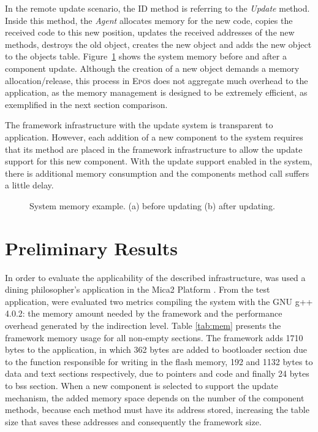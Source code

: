 \documentclass[10pt]{sigplanconf}
\newcommand{\epos}{\textsc{Epos}}
\newcommand{\agent}{\textit{Agent}}
\newcommand{\fig}[4][tb]{
  \begin{figure}[#1] {\centering{\texttt{[image: figures/\#2]}}\par}
    \caption{#3\label{fig:#2}}
  \end{figure}
}
\begin{document}
In the remote update scenario, the ID method is referring to the \textit{Update} method. Inside this method, the \agent{} allocates memory for the new code, copies the received code to this new position, updates the received addresses of the new methods, destroys the old object, creates the new object and adds the new object to the objects table. Figure~\ref{fig:memory_3_eng.pdf} shows the system memory before and after a component update. Although the creation of a new object demands a memory allocation/release, this process in \epos{} does not aggregate much overhead to the application, as the memory management is designed to be extremely efficient, as exemplified in the next section comparison.

The framework infrastructure with the update system is transparent to application. However, each addition of a new component to the system requires that its method are placed in the framework infrastructure to allow the update support for this new component. With the update support enabled in the system, there is additional memory consumption and the components method call suffers a little delay.

\fig{memory_3_eng.pdf}{System memory example. (a) before updating (b) after updating.}{width=6cm}

\section{Preliminary Results}

In order to evaluate the applicability of the described infrastructure, was used a dining philosopher's application in the Mica2 Platform \cite{mica2}. From the test application, were evaluated two metrics compiling the system with the GNU g++ 4.0.2: the memory amount needed by the framework and the performance overhead generated by the indirection level. Table \ref{tab:mem} presents the framework memory usage for all non-empty sections. The framework adds 1710 bytes to the application, in which 362 bytes are added to bootloader section due to the function responsible for writing in the flash memory, 192 and 1132 bytes to data and text sections respectively, due to pointers and code and finally 24 bytes to bss section. When a new component is selected to support the update mechanism, the added memory space depends on the number of the component methods, because each method must have its address stored, increasing the table size that saves these addresses and consequently the framework size.
\end{document}
